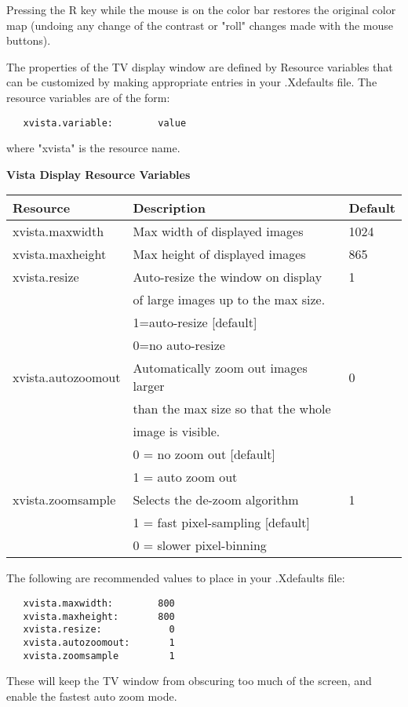 Pressing the R key while the mouse is on the color bar restores the
original color map (undoing any change of the contrast or "roll" changes
made with the mouse buttons).
 
 
The properties of the TV display window are defined by Resource variables
that can be customized by making appropriate entries in your .Xdefaults
file.  The resource variables are of the form:
\begin{verbatim}
   xvista.variable:        value
\end{verbatim}
where "xvista" is the resource name.

\begin{center}
{\bf Vista Display Resource Variables}\\
\begin{tabular}{lll}
\hline
Resource & Description & Default \\
\hline
xvista.maxwidth   & Max width of displayed images      &1024 \\
xvista.maxheight  & Max height of displayed images     & 865 \\
xvista.resize     & Auto-resize the window on display  &   1 \\
                  & of large images up to the max size.&\\
                  & 1=auto-resize [default]            &\\
                  & 0=no auto-resize                   &\\
xvista.autozoomout& Automatically zoom out images larger& 0\\
                  & than the max size so that the whole &\\
                  & image is visible.                   &\\
                  & 0 = no zoom out [default]           &\\
                  & 1 = auto zoom out                   &\\
xvista.zoomsample & Selects the de-zoom algorithm        &1 \\
                  & 1 = fast pixel-sampling [default]   &\\
                  & 0 = slower pixel-binning            &\\
\hline
\end{tabular}
\end{center}
 
The following are recommended values to place in your .Xdefaults file:
\begin{verbatim}
   xvista.maxwidth:        800
   xvista.maxheight:       800
   xvista.resize:            0
   xvista.autozoomout:       1
   xvista.zoomsample         1
\end{verbatim}
These will keep the TV window from obscuring too much of the screen, and
enable the fastest auto zoom mode.
 
